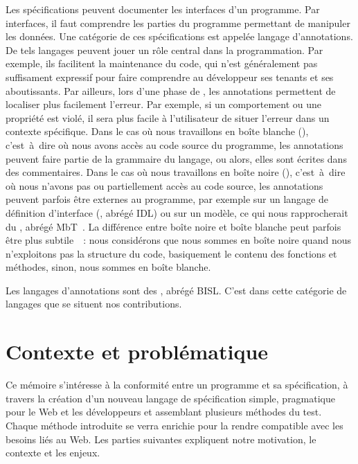 Les spécifications peuvent documenter les {\strong interfaces} d'un programme.
Par interfaces, il faut comprendre les parties du programme permettant de
manipuler les données. Une catégorie de ces spécifications est appelée {\strong
langage d'annotations}. De tels langages peuvent jouer un rôle central dans la
programmation. Par exemple, ils facilitent la maintenance du code, qui n'est
généralement pas suffisament expressif pour faire comprendre au développeur ses
tenants et ses aboutissants. Par ailleurs, lors d'une phase de
, les annotations permettent de localiser plus facilement
l'erreur. Par exemple, si un comportement ou une propriété est violé, il sera
plus facile à l'utilisateur de situer l'erreur dans un contexte spécifique. Dans
le cas où nous travaillons en {\strong boîte blanche} (),
c'est~à~dire où nous avons accès au code source du programme, les annotations
peuvent faire partie de la grammaire du langage, ou alors, elles sont écrites
dans des commentaires. Dans le cas où nous travaillons en {\strong boîte noire}
(), c'est~à~dire où nous n'avons pas ou partiellement accès
au code source, les annotations peuvent parfois être externes au programme, par
exemple sur un langage de définition d'interface (, abrégé IDL) ou sur un modèle, ce qui nous rapprocherait du
, abrégé MbT~. La différence
entre boîte noire et boîte blanche peut parfois être plus
subtile~~: nous considérons que nous sommes en boîte noire quand
nous n'exploitons pas la structure du code, basiquement le contenu des fonctions
et méthodes, sinon, nous sommes en boîte blanche.

Les langages d'annotations sont des , abrégé BISL. C'est dans cette catégorie de langages que
se situent nos contributions.

\section{Contexte et problématique}

Ce mémoire s'intéresse à la conformité entre un programme et sa spécification, à
travers la création d'un nouveau langage de spécification simple, pragmatique
pour le Web et les développeurs et assemblant plusieurs méthodes du test. Chaque
méthode introduite se verra enrichie pour la rendre compatible avec les besoins
liés au Web. Les parties suivantes expliquent notre motivation, le contexte et
les enjeux.

